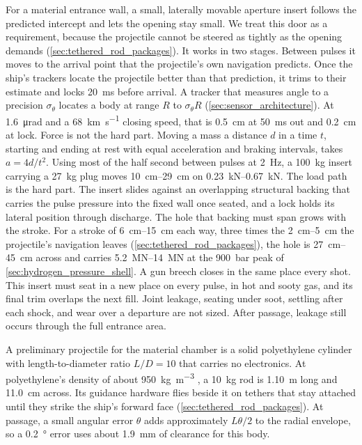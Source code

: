 \documentclass{article}
\begin{document}
For a material entrance wall, a small, laterally movable aperture insert follows the predicted intercept and lets the opening stay small. We treat this door as a requirement, because the projectile cannot be steered as tightly as the opening demands (\autoref{sec:tethered_rod_packages}). It works in two stages. Between pulses it moves to the arrival point that the projectile's own navigation predicts. Once the ship's trackers locate the projectile better than that prediction, it trims to their estimate and locks \SI{20}{\milli\second} before arrival. A tracker that measures angle to a precision $\sigma_\theta$ locates a body at range $R$ to $\sigma_\theta R$ (\autoref{sec:sensor_architecture}). At \SI{1.6}{\micro\radian} and a \SI{68}{\kilo\meter\per\second} closing speed, that is \SI{0.5}{\centi\meter} at \SI{50}{\milli\second} out and \SI{0.2}{\centi\meter} at lock. Force is not the hard part. Moving a mass a distance $d$ in a time $t$, starting and ending at rest with equal acceleration and braking intervals, takes $a=4d/t^2$. Using most of the half second between pulses at \SI{2}{\hertz}, a \SI{100}{\kilogram} insert carrying a \SI{27}{\kilogram} plug moves \SIrange{10}{29}{\centi\meter} on \SIrange{0.23}{0.67}{\kilo\newton}. The load path is the hard part. The insert slides against an overlapping structural backing that carries the pulse pressure into the fixed wall once seated, and a lock holds its lateral position through discharge. The hole that backing must span grows with the stroke. For a stroke of \SIrange{6}{15}{\centi\meter} each way, three times the \SIrange{2}{5}{\centi\meter} the projectile's navigation leaves (\autoref{sec:tethered_rod_packages}), the hole is \SIrange{27}{45}{\centi\meter} across and carries \SIrange{5.2}{14}{\mega\newton} at the \SI{900}{\bar} peak of \autoref{sec:hydrogen_pressure_shell}. A gun breech closes in the same place every shot. This insert must seat in a new place on every pulse, in hot and sooty gas, and its final trim overlaps the next fill. Joint leakage, seating under soot, settling after each shock, and wear over a departure are not sized. After passage, leakage still occurs through the full entrance area.

A preliminary projectile for the material chamber is a solid polyethylene cylinder with length-to-diameter ratio $L/D=10$ that carries no electronics. At polyethylene's density of about \SI{950}{\kilogram\per\cubic\meter} \cite{crc_handbook}, a \SI{10}{\kilogram} rod is \SI{1.10}{\meter} long and \SI{11.0}{\centi\meter} across. Its guidance hardware flies beside it on tethers that stay attached until they strike the ship's forward face (\autoref{sec:tethered_rod_packages}). At passage, a small angular error $\theta$ adds approximately $L\theta/2$ to the radial envelope, so a \SI{0.2}{\degree} error uses about \SI{1.9}{\milli\meter} of clearance for this body.
\end{document}

